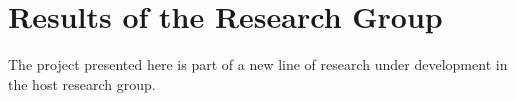 \chapter{Results of the Research Group}%


The project presented here is part of a new line of research under development in the host research group.
